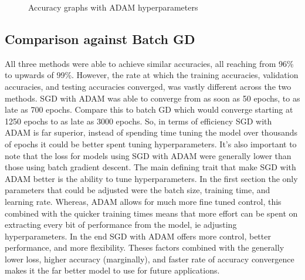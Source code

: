 \documentclass[12pt]{article}
\begin{document}
\begin{figure}[!]
  \hfill
  \hfill
  \caption{Accuracy graphs with ADAM hyperparameters}
\end{figure}


\newpage
\subsection{Comparison against Batch GD}
All three methods were able to achieve similar accuracies, all reaching from 96\% to upwards of 99\%.
However, the rate at which the training accuracies, validation accuracies, and testing accuracies converged,
was vastly different across the two methods. SGD with ADAM was able to converge from as soon as 50 epochs,
to as late as 700 epochs. Compare this to batch GD which would converge starting at 1250 epochs to as late as
3000 epochs. So, in terms of efficiency SGD with ADAM is far superior, instead of spending time tuning the
model over thousands of epochs it could be better spent tuning hyperparameters. It's also important to note that
the loss for models using SGD with ADAM were generally lower than those using batch gradient descent.
The main defining trait that make SGD with ADAM better is the ability to tune hyperparameters. In the first
section the only parameters that could be adjusted were the batch size, training time, and learning rate. Whereas,
ADAM allows for much more fine tuned control, this combined with the quicker training times means that
more effort can be spent on extracting every bit of performance from the model, ie adjusting hyperparameters.
In the end SGD with ADAM offers more control, better performance, and more flexibility. Theses factors combined with 
the generally lower loss, higher accuracy (marginally), and faster rate of accuracy convergence makes it the far 
better model to use for future applications. 
\end{document}
